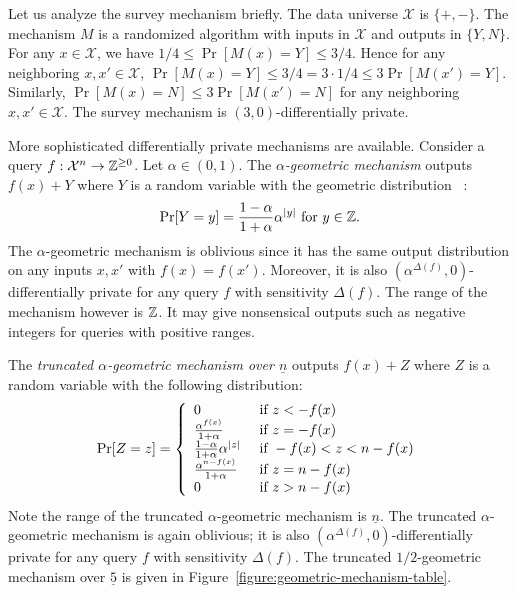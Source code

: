 Let us analyze the survey mechanism briefly. The data universe
$\mathcal{X}$ is $\{ +, - \}$. The mechanism $M$ is a randomized
algorithm with inputs in $\mathcal{X}$ and outputs in $\{ Y, N
\}$. For any $x \in \mathcal{X}$, we have $1/4 \leq \Pr[M(x) = Y] \leq
3/4$. Hence for any neighboring $x, x' \in \mathcal{X}$, $\Pr[M(x) =
Y] \leq 3/4 = 3 \cdot 1/4 \leq 3 \Pr[M (x') =
Y]$. Similarly, $\Pr[M (x) = N] \leq 3 \Pr[M (x') = N]$ for any
neighboring $x, x' \in \mathcal{X}$. The survey mechanism is
$(3, 0)$-differentially private. 

More sophisticated differentially private mechanisms are
available. Consider a query 
$f : \mathcal{X}^n \rightarrow \mathbb{Z}^{\geq 0}$. Let $\alpha \in (0, 1)$. 
The \emph{$\alpha$-geometric mechanism} 
outputs $f(x) + Y$ where $Y$ is a random variable with the geometric
distribution~\cite{GRS:09:UUPM,GRS:12:UUPM} :
\[
\Pr[Y = y] = \frac{1 - \alpha}{1 + \alpha}\alpha^{|y|}
\textmd{ for } y \in \mathbb{Z}.
\]
The $\alpha$-geometric mechanism is oblivious since it has the same
output distribution on any inputs $x, x'$ with $f (x) = f
(x')$. Moreover, it is also $(\alpha^{\Delta (f)}, 0)$-differentially
private for any query $f$ with sensitivity $\Delta (f)$. The range of
the mechanism 
however is $\mathbb{Z}$. It may give nonsensical outputs such as
negative integers for queries with positive ranges.

The \emph{truncated $\alpha$-geometric mechanism over $\underline{n}$}
outputs $f (x) + Z$ where $Z$ is a random variable with the following
distribution: 
\[
\Pr[Z = z] =
\left\{
  \begin{array}{ll}
    0 & \textmd{ if } z < - f (x) \\
    \frac{\alpha^{f (x)}}{1 + \alpha} & \textmd{ if } z = -f (x)\\
    \frac{1 - \alpha}{1 + \alpha}\alpha^{|z|} & 
    \textmd{ if } -f (x) < z < n - f (x)\\
    \frac{\alpha^{n - f (x)}}{1 + \alpha} & \textmd{ if } z = n-f (x)\\
    0 & \textmd{ if } z > n - f (x)
  \end{array}
\right.
\]
Note the range of the truncated $\alpha$-geometric mechanism is
$\underline{n}$. The truncated $\alpha$-geometric mechanism is 
again oblivious; it is also $(\alpha^{\Delta (f)}, 0)$-differentially
private for any query $f$ with sensitivity $\Delta (f)$.
The truncated $1/2$-geometric mechanism over $\underline{5}$ is
given in Figure~\ref{figure:geometric-mechanism-table}.

